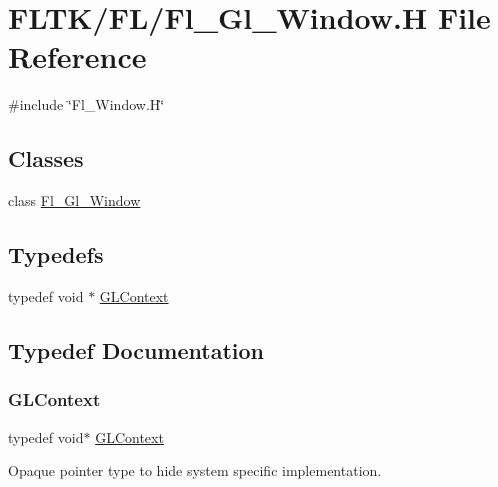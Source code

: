 \hypertarget{_fl___gl___window_8_h}{}\section{F\+L\+T\+K/\+F\+L/\+Fl\+\_\+\+Gl\+\_\+\+Window.H File Reference}
\label{_fl___gl___window_8_h}
{\ttfamily \#include \char`\"{}Fl\+\_\+\+Window.\+H\char`\"{}}\newline
\subsection*{Classes}
\begin{DoxyCompactItemize}
\item 
class \hyperlink{class_fl___gl___window}{Fl\+\_\+\+Gl\+\_\+\+Window}
\end{DoxyCompactItemize}
\subsection*{Typedefs}
\begin{DoxyCompactItemize}
\item 
typedef void $\ast$ \hyperlink{_fl___gl___window_8_h_a8b97f78027948271057d3c823105a842}{G\+L\+Context}
\end{DoxyCompactItemize}


\subsection{Typedef Documentation}
\mbox{\label{_fl___gl___window_8_h_a8b97f78027948271057d3c823105a842}} 
\subsubsection{\texorpdfstring{G\+L\+Context}{GLContext}}
{\footnotesize\ttfamily typedef void$\ast$ \hyperlink{_fl___gl___window_8_h_a8b97f78027948271057d3c823105a842}{G\+L\+Context}}

Opaque pointer type to hide system specific implementation. 